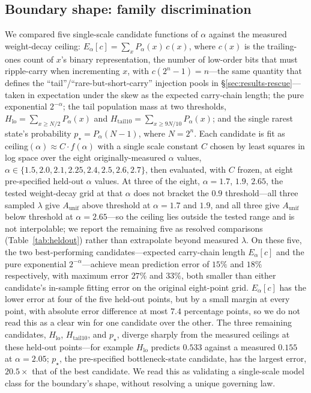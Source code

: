 \documentclass[11pt]{article}
\begin{document}
\subsection{Boundary shape: family discrimination}
\label{sec:results-family}

We compared five single-scale candidate functions of $\alpha$ against the measured weight-decay ceiling: $E_\alpha[c]=\sum_x P_\alpha(x)\,c(x)$, where $c(x)$ is the trailing-ones count of $x$'s binary representation, the number of low-order bits that must ripple-carry when incrementing $x$, with $c(2^n-1)=n$---the same quantity that defines the ``tail''/``rare-but-short-carry'' injection pools in \S\ref{sec:results-rescue}---taken in expectation under the skew as the expected carry-chain length; the pure exponential $2^{-\alpha}$; the tail population mass at two thresholds, $H_{\mathrm{lo}}=\sum_{x\ge N/2}P_\alpha(x)$ and $H_{\mathrm{tail10}}=\sum_{x\ge 9N/10}P_\alpha(x)$; and the single rarest state's probability $p_\star=P_\alpha(N-1)$, where $N=2^n$. Each candidate is fit as ceiling$(\alpha)\approx C\cdot f(\alpha)$ with a single scale constant $C$ chosen by least squares in log space over the eight originally-measured $\alpha$ values, $\alpha\in\{1.5,2.0,2.1,2.25,2.4,2.5,2.6,2.7\}$, then evaluated, with $C$ frozen, at eight pre-specified held-out $\alpha$ values. At three of the eight, $\alpha=1.7$, $1.9$, $2.65$, the tested weight-decay grid at that $\alpha$ does not bracket the $0.9$ threshold---all three sampled $\lambda$ give $A_{\mathrm{unif}}$ above threshold at $\alpha=1.7$ and $1.9$, and all three give $A_{\mathrm{unif}}$ below threshold at $\alpha=2.65$---so the ceiling lies outside the tested range and is not interpolable; we report the remaining five as resolved comparisons (Table~\ref{tab:heldout}) rather than extrapolate beyond measured $\lambda$. On these five, the two best-performing candidates---expected carry-chain length $E_\alpha[c]$ and the pure exponential $2^{-\alpha}$---achieve mean prediction error of $15\%$ and $18\%$ respectively, with maximum error $27\%$ and $33\%$, both smaller than either candidate's in-sample fitting error on the original eight-point grid. $E_\alpha[c]$ has the lower error at four of the five held-out points, but by a small margin at every point, with absolute error difference at most $7.4$ percentage points, so we do not read this as a clear win for one candidate over the other. The three remaining candidates, $H_{\mathrm{lo}}$, $H_{\mathrm{tail10}}$, and $p_\star$, diverge sharply from the measured ceilings at these held-out points---for example $H_{\mathrm{lo}}$ predicts $0.533$ against a measured $0.155$ at $\alpha=2.05$; $p_\star$, the pre-specified bottleneck-state candidate, has the largest error, $20.5\times$ that of the best candidate. We read this as validating a single-scale model class for the boundary's shape, without resolving a unique governing law.
\end{document}
